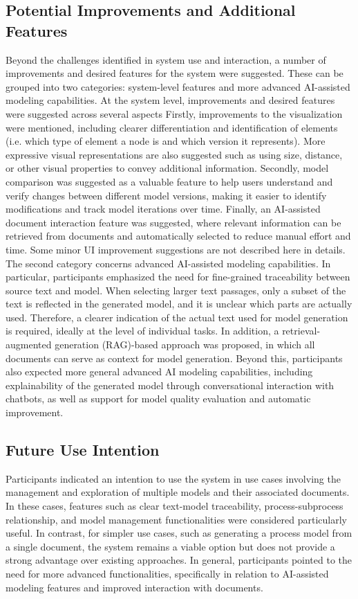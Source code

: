 \subsection{Potential Improvements and Additional Features}
Beyond the challenges identified in system use and interaction, a number of improvements and desired features for the system were suggested. These can be grouped into two categories: system-level features and more advanced AI-assisted modeling capabilities.
At the system level, improvements and desired features were suggested across several aspects Firstly, improvements to the visualization were mentioned, including clearer differentiation and identification of elements (i.e. which type of element a node is and which version it represents). More expressive visual representations are also suggested such as using size, distance, or other visual properties to convey additional information. Secondly, model comparison was suggested as a valuable feature to help users understand and verify changes between different model versions, making it easier to identify modifications and track model iterations over time. Finally, an AI-assisted document interaction feature was suggested, where relevant information can be retrieved from documents and automatically selected to reduce manual effort and time. Some minor UI improvement suggestions are not described here in details.
The second category concerns advanced AI-assisted modeling capabilities. In particular, participants emphasized the need for fine-grained traceability between source text and model. When selecting larger text passages, only a subset of the text is reflected in the generated model, and it is unclear which parts are actually used. Therefore, a clearer indication of the actual text used for model generation is required, ideally at the level of individual tasks. In addition, a retrieval-augmented generation (RAG)-based approach was proposed, in which all documents can serve as context for model generation. Beyond this, participants also expected more general advanced AI modeling capabilities, including explainability of the generated model through conversational interaction with chatbots, as well as support for model quality evaluation and automatic improvement.
\subsection{Future Use Intention}
Participants indicated an intention to use the system in use cases involving the management and exploration of multiple models and their associated documents. In these cases, features such as clear text-model traceability, process-subprocess relationship, and model management functionalities were considered particularly useful. In contrast, for simpler use cases, such as generating a process model from a single document, the system remains a viable option but does not provide a strong advantage over existing approaches. In general, participants pointed to the need for more advanced functionalities, specifically in relation to AI-assisted modeling features and improved interaction with documents.



